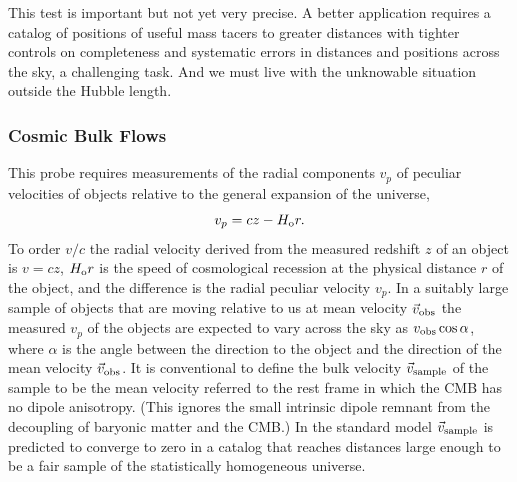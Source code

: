 \documentclass[fleqn,12pt]{article}
\newcommand{\beq}{\begin{equation}}
\newcommand{\eeq}{\end{equation}}
\begin{document}
This test is important but not yet very precise. A better application requires a catalog of positions of useful mass tacers to greater distances with tighter controls on completeness and systematic errors in distances and positions across the sky, a challenging task. And we must live with the unknowable situation outside the Hubble length.

\subsubsection{Cosmic Bulk Flows}\label{sec:bulkflows}

This probe requires measurements of the radial components $v_p$ of peculiar velocities of objects relative to the general expansion of the universe, 
\beq
v_p = cz - H_{\rm o}r. \label{eq:peculiarvelocity}
\eeq
To order $v/c$ the radial velocity derived from the measured redshift $z$ of an object is $v =  cz$, $H_{\rm o}r$ is the speed of cosmological recession at the physical distance $r$ of the object, and the difference is the radial peculiar velocity $v_p$. In a suitably large sample of objects that are moving relative to us at mean velocity $\vec v_{\rm obs}$ the measured  $v_p$ of the objects are expected to vary across the sky as $v_{\rm obs}\cos\alpha$, where $\alpha$ is the angle between the direction to the object and the direction of the mean velocity $\vec v_{\rm obs}$. It is conventional to define the bulk velocity $\vec v_{\rm sample}$ of the sample to be the mean velocity referred to the rest frame in which the CMB has no dipole anisotropy. (This ignores the small intrinsic dipole remnant from the decoupling of baryonic matter and the CMB.) In the standard model $\vec v_{\rm sample}$ is predicted to converge to zero in a catalog that reaches distances large enough to be a fair sample of the statistically homogeneous universe. 

\end{document}
